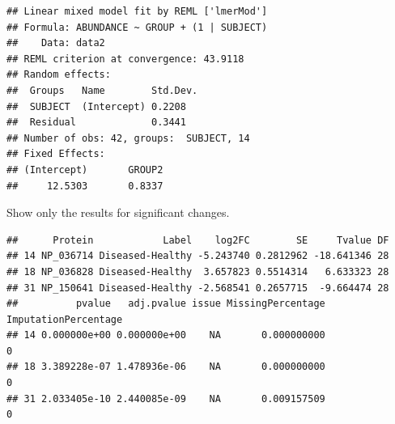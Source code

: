 \documentclass[]{book}
\newenvironment{Shaded}{\begin{snugshade}}{\end{snugshade}}
\newcommand{\CommentTok}[1]{\textcolor[rgb]{0.56,0.35,0.01}{\textit{#1}}}
\newcommand{\DecValTok}[1]{\textcolor[rgb]{0.00,0.00,0.81}{#1}}
\newcommand{\FloatTok}[1]{\textcolor[rgb]{0.00,0.00,0.81}{#1}}
\newcommand{\KeywordTok}[1]{\textcolor[rgb]{0.13,0.29,0.53}{\textbf{#1}}}
\newcommand{\NormalTok}[1]{#1}
\newcommand{\OperatorTok}[1]{\textcolor[rgb]{0.81,0.36,0.00}{\textbf{#1}}}
\newcommand{\StringTok}[1]{\textcolor[rgb]{0.31,0.60,0.02}{#1}}
\begin{document}
\begin{Shaded}
\end{Shaded}

\begin{verbatim}
## Linear mixed model fit by REML ['lmerMod']
## Formula: ABUNDANCE ~ GROUP + (1 | SUBJECT)
##    Data: data2
## REML criterion at convergence: 43.9118
## Random effects:
##  Groups   Name        Std.Dev.
##  SUBJECT  (Intercept) 0.2208  
##  Residual             0.3441  
## Number of obs: 42, groups:  SUBJECT, 14
## Fixed Effects:
## (Intercept)       GROUP2  
##     12.5303       0.8337
\end{verbatim}

Show only the results for significant changes.

\begin{Shaded}
\end{Shaded}

\begin{verbatim}
##      Protein            Label    log2FC        SE     Tvalue DF
## 14 NP_036714 Diseased-Healthy -5.243740 0.2812962 -18.641346 28
## 18 NP_036828 Diseased-Healthy  3.657823 0.5514314   6.633323 28
## 31 NP_150641 Diseased-Healthy -2.568541 0.2657715  -9.664474 28
##          pvalue   adj.pvalue issue MissingPercentage ImputationPercentage
## 14 0.000000e+00 0.000000e+00    NA       0.000000000                    0
## 18 3.389228e-07 1.478936e-06    NA       0.000000000                    0
## 31 2.033405e-10 2.440085e-09    NA       0.009157509                    0
\end{verbatim}
\end{document}
